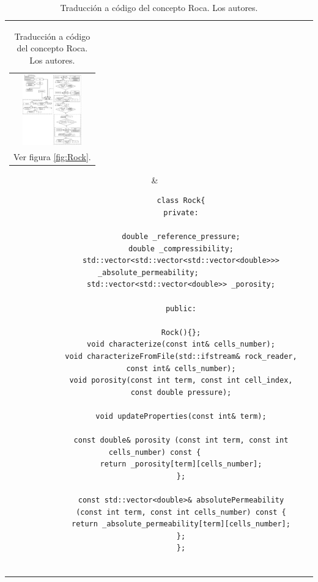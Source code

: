 \begin{table}[h!]
	\centering
	\begin{tabular}{cc}
		\parbox[c]{1em}{
			\begin{tabular}[c]{@{}c@{}}\includegraphics[width=1in]{Fig/Rock.pdf}\\ Ver figura \ref{fig:Rock}.\end{tabular}
		}
		&
		\begin{tiny}
			\begin{lstlisting}
			class Rock{
			private:
			
			double _reference_pressure;
			double _compressibility;
			std::vector<std::vector<std::vector<double>>> _absolute_permeability;   
			std::vector<std::vector<double>> _porosity;
			
			public:
			
			Rock(){};
			void characterize(const int& cells_number);
			void characterizeFromFile(std::ifstream& rock_reader,
			const int& cells_number);
			void porosity(const int term, const int cell_index,
			const double pressure);
			
			void updateProperties(const int& term);
			
			const double& porosity (const int term, const int cells_number) const {
			return _porosity[term][cells_number];
			};
			
			const std::vector<double>& absolutePermeability
			(const int term, const int cells_number) const {
			return _absolute_permeability[term][cells_number];
			};
			};
			
			\end{lstlisting}
		\end{tiny}
	\end{tabular}
	\caption[Traducción a código del concepto Roca.]{Traducción a código del concepto Roca. Los autores. \label{tab:RockCode}}
\end{table}

